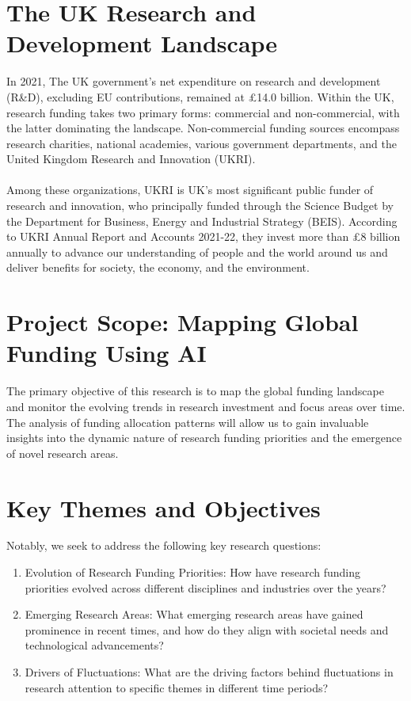 \documentclass[12pt,twoside]{report}
\begin{document}
\section*{The UK Research and Development Landscape}
In 2021, The UK government’s net expenditure on research and development (R\&D), excluding EU contributions, remained at \pounds14.0 billion. Within the UK, research funding takes two primary forms: commercial and non-commercial, with the latter dominating the landscape. Non-commercial funding sources encompass research charities, national academies, various government departments, and the United Kingdom Research and Innovation (UKRI).\\
~\\
Among these organizations, UKRI is UK's most significant public funder of research and innovation, who principally funded through the Science Budget by the Department for Business, Energy and Industrial Strategy (BEIS). According to UKRI Annual Report and Accounts 2021-22, they invest more than £8 billion annually to advance our understanding of people and the world around us and deliver benefits for society, the economy, and the environment. 



\section*{Project Scope: Mapping Global Funding Using AI}
The primary objective of this research is to map the global funding landscape and monitor the evolving trends in research investment and focus areas over time. The analysis of funding allocation patterns will allow us to gain invaluable insights into the dynamic nature of research funding priorities and the emergence of novel research areas. 

\section*{Key Themes and Objectives}
Notably, we seek to address the following key research questions:

\begin{enumerate}
  \item Evolution of Research Funding Priorities: How have research funding priorities evolved across different disciplines and industries over the years? 
  \item Emerging Research Areas: What emerging research areas have gained prominence in recent times, and how do they align with societal needs and technological advancements?
  \item Drivers of Fluctuations: What are the driving factors behind fluctuations in research attention to specific themes in different time periods?
 
\end{enumerate}
\end{document}
